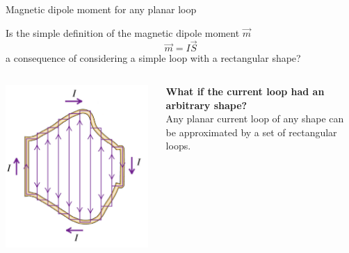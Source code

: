 \begin{frame}{Magnetic dipole moment for any planar loop}

Is the simple definition of the magnetic dipole moment $\vec{m}$
\begin{equation*}
  \vec{m} = I \vec{S}
\end{equation*}
a consequence of considering a simple loop with a rectangular shape?\\

\begin{columns}
  \begin{column}{0.40\textwidth}
     \includegraphics[width=0.98\textwidth]{./images/schematics/current_loop_irregular_shape.png}\\
  \end{column}
  \begin{column}{0.60\textwidth}
      {\bf What if the current loop had an arbitrary shape?}\\
     \vspace{0.3cm}
      Any planar current loop of any shape can be approximated by a
      set of rectangular loops.
  \end{column}
\end{columns}

\end{frame}

